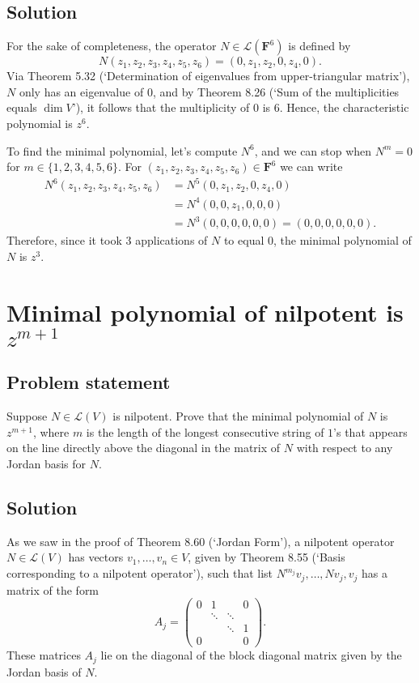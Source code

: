 \documentclass{article}
\begin{document}
\subsection*{Solution}
For the sake of completeness, the operator $N\in\mathcal{L}(\mathbf{F}^6)$ is defined by
\[N(z_1,z_2,z_3,z_4,z_5,z_6)=(0,z_1,z_2,0,z_4,0).\]
Via Theorem 5.32 (`Determination of eigenvalues from upper-triangular matrix'), $N$ only has an eigenvalue of $0$, and by Theorem 8.26 (`Sum of the multiplicities equals $\operatorname{dim}V$'), it follows that the multiplicity of $0$ is $6$. 
Hence, the characteristic polynomial is $z^6$.

To find the minimal polynomial, let's compute $N^6$, and we can stop when $N^m=0$ for $m\in\{1,2,3,4,5,6\}$. For $(z_1,z_2,z_3,z_4,z_5,z_6)\in\mathbf{F}^6$ we can write
\begin{align*}
    N^6(z_1,z_2,z_3,z_4,z_5,z_6)&=N^5(0,z_1,z_2,0,z_4,0)\\
    &=N^4(0,0,z_1,0,0,0)\\
    &=N^3(0,0,0,0,0,0)=(0,0,0,0,0,0).
\end{align*}
Therefore, since it took 3 applications of $N$ to equal $0$, the minimal polynomial of $N$ is $z^3$.

\clearpage

\section{Minimal polynomial of nilpotent is $z^{m+1}$}
\subsection*{Problem statement}
Suppose $N\in\mathcal{L}(V)$ is nilpotent. Prove that the minimal polynomial of $N$ is $z^{m+1}$, where $m$ is the length of the longest consecutive string of $1$'s that appears on the line directly above the diagonal in the matrix of $N$ with respect to any Jordan basis for $N$.

\subsection*{Solution}
As we saw in the proof of Theorem 8.60 (`Jordan Form'), a nilpotent operator $N\in\mathcal{L}(V)$ has vectors $v_1,\ldots,v_n\in V$, given by Theorem 8.55 (`Basis corresponding to a nilpotent operator'), such that list $N^{m_j}v_j,\ldots,Nv_j,v_j$ has a matrix of the form
\begin{equation*}
A_j=\begin{pmatrix}
0 & 1 &  & 0\\
 & \ddots & \ddots & \\
 &  & \ddots & 1\\
0 &  &  & 0
\end{pmatrix}.
\end{equation*}
These matrices $A_j$ lie on the diagonal of the block diagonal matrix given by the Jordan basis of $N$.
\end{document}
